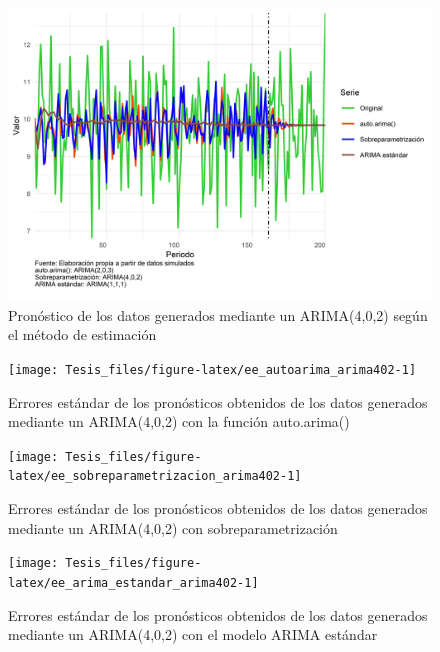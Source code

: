 \documentclass[
]{article}
\begin{document}
\begin{figure}[H]
\includegraphics[width=1\linewidth,height=1\textheight]{Tesis_files/figure-latex/pronostico_arima402-1} \caption{Pronóstico de los datos generados mediante un ARIMA(4,0,2) según el método de estimación}\label{fig:pronostico_arima402}
\end{figure}

\begin{figure}[H]
\texttt{[image: Tesis\_files/figure-latex/ee\_autoarima\_arima402-1]} \caption{Errores estándar de los pronósticos obtenidos de los datos generados mediante un ARIMA(4,0,2) con la función auto.arima()}\label{fig:ee_autoarima_arima402}
\end{figure}

\begin{figure}[H]
\texttt{[image: Tesis\_files/figure-latex/ee\_sobreparametrizacion\_arima402-1]} \caption{Errores estándar de los pronósticos obtenidos de los datos generados mediante un ARIMA(4,0,2) con sobreparametrización}\label{fig:ee_sobreparametrizacion_arima402}
\end{figure}

\begin{figure}[H]
\texttt{[image: Tesis\_files/figure-latex/ee\_arima\_estandar\_arima402-1]} \caption{Errores estándar de los pronósticos obtenidos de los datos generados mediante un ARIMA(4,0,2) con el modelo ARIMA estándar}\label{fig:ee_arima_estandar_arima402}
\end{figure}
\end{document}
